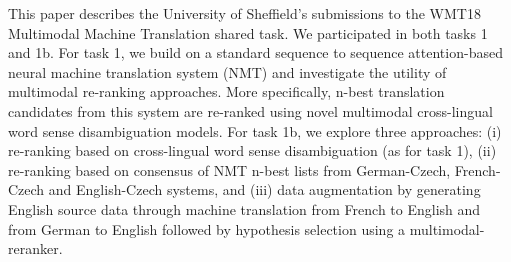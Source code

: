 This paper describes the University of Sheffield's submissions to the WMT18 Multimodal Machine Translation shared task. We participated in both tasks 1 and 1b. For task 1, we build on a standard sequence to sequence attention-based neural machine translation system (NMT) and investigate the utility of multimodal re-ranking approaches. More specifically, n-best translation candidates from this system are re-ranked using novel multimodal cross-lingual word sense disambiguation models. For task 1b, we explore three approaches: (i) re-ranking based on cross-lingual word sense disambiguation (as for task 1), (ii) re-ranking based on consensus of NMT n-best lists from German-Czech, French-Czech and English-Czech systems, and (iii) data augmentation by generating English source data through machine translation from French to English and from German to English followed by hypothesis selection using a multimodal-reranker.
